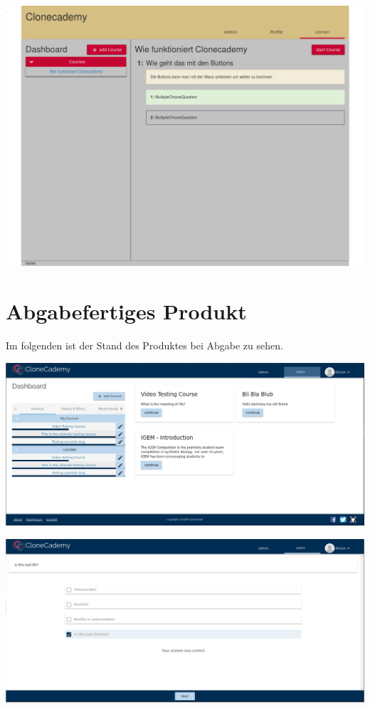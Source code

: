 \documentclass[accentcolor=tud0b,12pt,paper=a4]{tudreport}
\begin{document}
	\includegraphics[width=\textwidth]{appendix/screenshots/forntend.png}

	\section*{Abgabefertiges Produkt}
	Im folgenden ist der Stand des Produktes bei Abgabe zu sehen.

	\includegraphics[height=0.3\textheight]{appendix/screenshots/dashboard.jpg}

	\includegraphics[height=0.3\textheight]{appendix/screenshots/screenshot-0.jpg}
\end{document}
